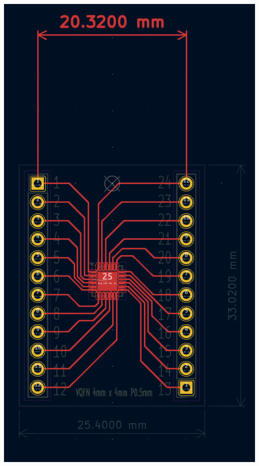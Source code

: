 \documentclass[11pt,a4paper,titlepage]{report}
\begin{document}
	\begin{center}
		\label{picture:breakout2}
		\includegraphics[scale=0.2]{assets/breakout_pcb_schema.png}
	\end{center}
\end{document}
